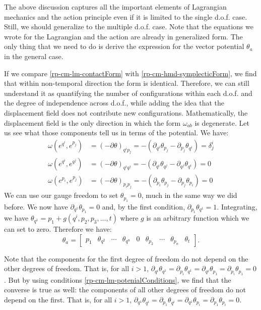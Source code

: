 The above discussion captures all the important elements of Lagrangian mechanics and the action principle even if it is limited to the single d.o.f. case. Still, we should generalize to the multiple d.o.f. case. Note that the equations we wrote for the Lagrangian and the action are already in generalized form. The only thing that we need to do is derive the expression for the vector potential $\theta_a$ in the general case.

If we compare \ref{rp-cm-lm-contactForm} with \ref{rp-cm-hmd-symplecticForm}, we find that within non-temporal direction the form is identical. Therefore, we can still understand it as quantifying the number of configurations within each d.o.f. and the degree of independence across d.o.f., while adding the idea that the displacement field does not contribute new configurations. Mathematically, the displacement field is the only direction in which the form $\omega_{ab}$ is degenerate. Let us see what those components tell us in terms of the potential. We have:
\begin{equation}\label{rp-cm-lm-potenialConditions}
	\begin{aligned}
		\omega(e^{q^i}, e^{p_j}) &= (-\partial\theta)_{q^i p_j} = -(\partial_{q^i}\theta_{p_j} - \partial_{p_j}\theta_{q^i}) = \delta^i_j \\
		\omega(e^{q^i}, e^{q^j}) &= (-\partial\theta)_{q^i q^j} = -(\partial_{q^i}\theta_{q^j} - \partial_{q^j}\theta_{q^i}) = 0 \\
		\omega(e^{p_i}, e^{p_j}) &= (-\partial\theta)_{p_i p_j} = -(\partial_{p_i}\theta_{p_j} - \partial_{p_j}\theta_{p_i}) = 0
	\end{aligned}
\end{equation}
We can use our gauge freedom to set $\theta_{p_1} = 0$, much in the same way we did before. We now have $\partial_{q^1} \theta_{p_1} = 0$ and, by the first condition, $\partial_{p_1} \theta_{q^1} = 1$. Integrating, we have $\theta_{q^1} = p_1 + g(q^i, p_2, p_3, ..., t)$ where $g$ is an arbitrary function which we can set to zero. Therefore we have:
\begin{equation}
	\theta_a =  \begin{bmatrix}
		p_1 & \theta_{q^2} & \cdots & \theta_{q^n} & 0 & \theta_{p_2} & \cdots & \theta_{p_n} & \theta_{t}
	\end{bmatrix}. 
\end{equation}

Note that the components for the first degree of freedom do not depend on the other degrees of freedom. That is, for all $i>1$, $\partial_{q^i} \theta_{q^1} = \partial_{p_i} \theta_{q^1} = \partial_{q^i} \theta_{p_1} = \partial_{p_i} \theta_{p_1} = 0$. But by using conditions \ref{rp-cm-lm-potenialConditions}, we find that the converse is true as well: the components of all other degrees of freedom do not depend on the first. That is, for all $i>1$, $\partial_{q^1} \theta_{q^i} = \partial_{p_1} \theta_{q^i} = \partial_{q^1} \theta_{p_i} = \partial_{p_1} \theta_{p_i} = 0$.

